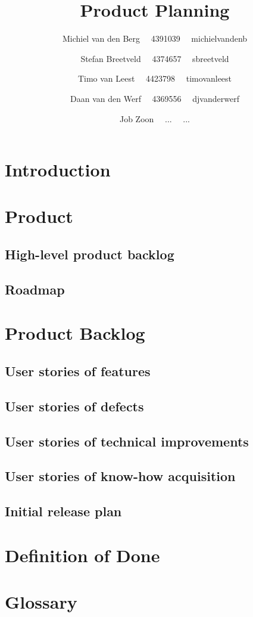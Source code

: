 \documentclass[11pt, a4paper]{article}
\title{Product Planning}
\author{ 	Michiel van den Berg \ \ 4391039 \ \ michielvandenb
		\and Stefan Breetveld \ \ 4374657 \ \ sbreetveld
  		\and Timo van Leest \ \ 4423798 \ \ timovanleest
		\and Daan van den Werf \ \ 4369556 \ \ djvanderwerf
   		\and Job Zoon \ \ ... \ \ ...  }
\begin{document}
\maketitle

\newpage
\tableofcontents
\newpage

\section{Introduction}

\newpage
\section{Product}
\subsection{High-level product backlog}
\subsection{Roadmap}

\newpage
\section{Product Backlog}
\subsection{User stories of features}
\subsection{User stories of defects}
\subsection{User stories of technical improvements}
\subsection{User stories of know-how acquisition}
\subsection{Initial release plan}

\newpage
\section{Definition of Done}

\newpage
\section{Glossary}
\end{document}
